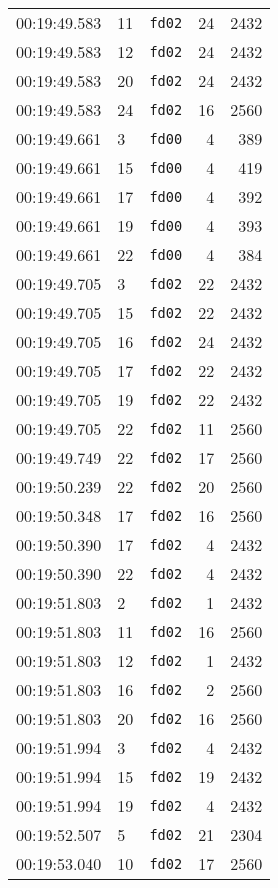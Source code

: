 \documentclass{article}
\begin{document}
\begin{longtable}{lllrr}
00:19:49.583 & 11 & \texttt{fd02} & 24 & 2432 \\
00:19:49.583 & 12 & \texttt{fd02} & 24 & 2432 \\
00:19:49.583 & 20 & \texttt{fd02} & 24 & 2432 \\
00:19:49.583 & 24 & \texttt{fd02} & 16 & 2560 \\
00:19:49.661 & 3 & \texttt{fd00} & 4 & 389 \\
00:19:49.661 & 15 & \texttt{fd00} & 4 & 419 \\
00:19:49.661 & 17 & \texttt{fd00} & 4 & 392 \\
00:19:49.661 & 19 & \texttt{fd00} & 4 & 393 \\
00:19:49.661 & 22 & \texttt{fd00} & 4 & 384 \\
00:19:49.705 & 3 & \texttt{fd02} & 22 & 2432 \\
00:19:49.705 & 15 & \texttt{fd02} & 22 & 2432 \\
00:19:49.705 & 16 & \texttt{fd02} & 24 & 2432 \\
00:19:49.705 & 17 & \texttt{fd02} & 22 & 2432 \\
00:19:49.705 & 19 & \texttt{fd02} & 22 & 2432 \\
00:19:49.705 & 22 & \texttt{fd02} & 11 & 2560 \\
00:19:49.749 & 22 & \texttt{fd02} & 17 & 2560 \\
00:19:50.239 & 22 & \texttt{fd02} & 20 & 2560 \\
00:19:50.348 & 17 & \texttt{fd02} & 16 & 2560 \\
00:19:50.390 & 17 & \texttt{fd02} & 4 & 2432 \\
00:19:50.390 & 22 & \texttt{fd02} & 4 & 2432 \\
00:19:51.803 & 2 & \texttt{fd02} & 1 & 2432 \\
00:19:51.803 & 11 & \texttt{fd02} & 16 & 2560 \\
00:19:51.803 & 12 & \texttt{fd02} & 1 & 2432 \\
00:19:51.803 & 16 & \texttt{fd02} & 2 & 2560 \\
00:19:51.803 & 20 & \texttt{fd02} & 16 & 2560 \\
00:19:51.994 & 3 & \texttt{fd02} & 4 & 2432 \\
00:19:51.994 & 15 & \texttt{fd02} & 19 & 2432 \\
00:19:51.994 & 19 & \texttt{fd02} & 4 & 2432 \\
00:19:52.507 & 5 & \texttt{fd02} & 21 & 2304 \\
00:19:53.040 & 10 & \texttt{fd02} & 17 & 2560 \\

\end{longtable}
\end{document}
